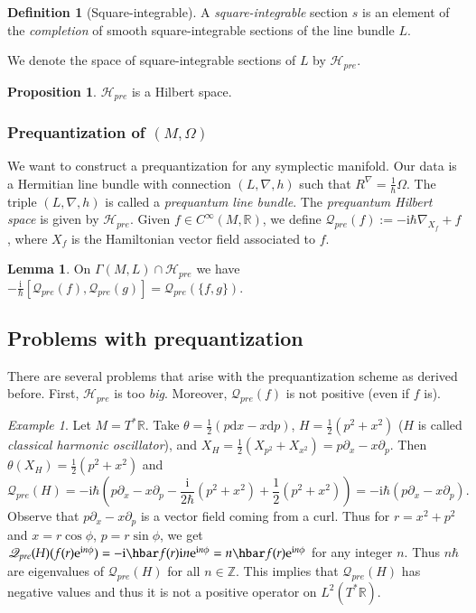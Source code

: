 \documentclass[11pt]{amsart}
\numberwithin{equation}{section}
\theoremstyle{plain}
\theoremstyle{definition}
\newtheorem{defn}{Definition}[subsection]
\newtheorem{prop}{Proposition}[subsection]
\newtheorem{lem}{Lemma}[subsection]
\theoremstyle{remark}
\newtheorem{ex}{Example}[subsection]
\newcommand{\R}{\mathbb{R}}
\newcommand{\dd}{{\mathrm{d}}}
\newcommand{\calH}{\mathcal{H}}
\newcommand{\I}{\mathrm{i}}
\newcommand{\ee}{\textnormal{e}}
\begin{document}
\begin{defn}[Square-integrable]
A \emph{square-integrable} section $s$ is an element of the \emph{completion} of smooth square-integrable sections of the line bundle $L$.
\end{defn}
We denote the space of square-integrable sections of $L$ by $\calH_{pre}$.

\begin{prop}
$\calH_{pre}$ is a Hilbert space.
\end{prop}

\subsubsection{Prequantization of $(M,\Omega)$}
We want to construct a prequantization for any symplectic manifold. Our data is a Hermitian line bundle with connection $(L,\nabla,h)$ such that $R^\nabla=\frac{1}{\hbar}\Omega$. The triple $(L,\nabla,h)$ is called a \emph{prequantum line bundle}. The \emph{prequantum Hilbert space} is given by $\calH_{pre}$. Given $f\in C^\infty(M,\R)$, we define $\mathscr{Q}_{pre}(f):=-\I\hbar\nabla_{X_f}+f$, where $X_f$ is the Hamiltonian vector field associated to $f$.


\begin{lem}
On $\Gamma(M,L)\cap\calH_{pre}$ we have $-\frac{\I}{\hbar}[\mathscr{Q}_{pre}(f),\mathscr{Q}_{pre}(g)]=\mathscr{Q}_{pre}(\{f,g\})$.
\end{lem}

\subsection{Problems with prequantization}
There are several problems that arise with the prequantization scheme as derived before. First, $\calH_{pre}$ is too \emph{big}. Moreover, $\mathscr{Q}_{pre}(f)$ is not positive (even if $f$ is).

\begin{ex}
Let $M=T^*\R$. Take $\theta=\frac{1}{2}(p\dd x-x\dd p)$, $H=\frac{1}{2}(p^2+x^2)$ ($H$ is called \emph{classical harmonic oscillator}), and $X_H=\frac{1}{2}(X_{p^2}+X_{x^2})=p\partial_x-x\partial_p$. Then $\theta(X_H)=\frac{1}{2}(p^2+x^2)$ and 
\[
\mathscr{Q}_{pre}(H)=-\I\hbar\left(p\partial_x-x\partial_p-\frac{\I}{2\hbar}(p^2+x^2)+\frac{1}{2}(p^2+x^2)\right)=-\I\hbar(p\partial_x-x\partial_p).
\]
Observe that $p\partial_x-x\partial_p$ is a vector field coming from a curl. Thus  for $r=x^2+p^2$ and $x=r\cos\phi$, $p=r\sin\phi$, we get $\mathscr{Q}_{pre}(H)(f(r)\ee^{\I n\phi})=-\I\hbar f(r)\I n\ee^{\I n\phi}=n\hbar f(r)\ee^{\I n\phi}$ for any integer $n$. Thus $n\hbar$ are eigenvalues of $\mathscr{Q}_{pre}(H)$ for all $n\in\mathbb{Z}$. This implies that $\mathscr{Q}_{pre}(H)$ has negative values and thus it is not a positive operator on $L^2(T^*\R)$.
\end{ex}
\end{document}
